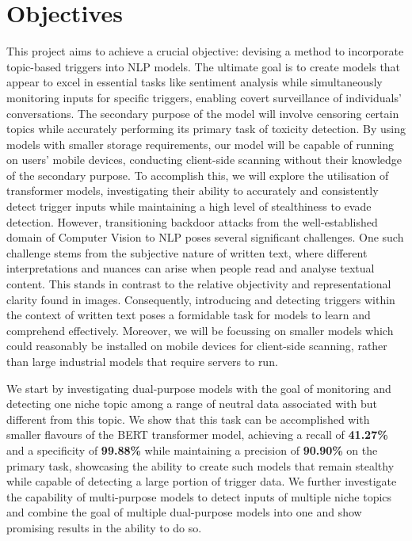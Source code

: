\section{Objectives}

This project aims to achieve a crucial objective: devising a method to incorporate topic-based triggers into NLP models. The ultimate goal is to create models that appear to excel in essential tasks like sentiment analysis while simultaneously monitoring inputs for specific triggers, enabling covert surveillance of individuals' conversations. The secondary purpose of the model will involve censoring certain topics while accurately performing its primary task of toxicity detection. By using models with smaller storage requirements, our model will be capable of running on users' mobile devices, conducting client-side scanning without their knowledge of the secondary purpose. To accomplish this, we will explore the utilisation of transformer models, investigating their ability to accurately and consistently detect trigger inputs while maintaining a high level of stealthiness to evade detection. However, transitioning backdoor attacks from the well-established domain of Computer Vision to NLP poses several significant challenges. One such challenge stems from the subjective nature of written text, where different interpretations and nuances can arise when people read and analyse textual content. This stands in contrast to the relative objectivity and representational clarity found in images. Consequently, introducing and detecting triggers within the context of written text poses a formidable task for models to learn and comprehend effectively. Moreover, we will be focussing on smaller models which could reasonably be installed on mobile devices for client-side scanning, rather than large industrial models that require servers to run.

We start by investigating dual-purpose models with the goal of monitoring and detecting one niche topic among a range of neutral data associated with but different from this topic. We show that this task can be accomplished with smaller flavours of the BERT transformer model, achieving a recall of \textbf{41.27\%} and a specificity of \textbf{99.88\%} while maintaining a precision of \textbf{90.90\%} on the primary task, showcasing the ability to create such models that remain stealthy while capable of detecting a large portion of trigger data. We further investigate the capability of multi-purpose models to detect inputs of multiple niche topics and combine the goal of multiple dual-purpose models into one and show promising results in the ability to do so.

